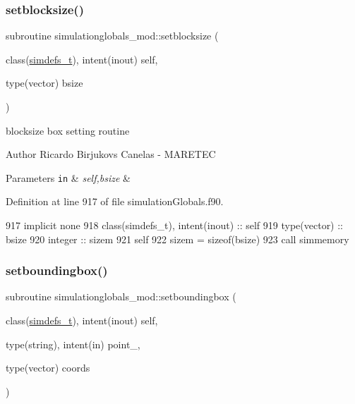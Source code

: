 \subsubsection{\texorpdfstring{setblocksize()}{setblocksize()}}
{\footnotesize\ttfamily subroutine simulationglobals\+\_\+mod\+::setblocksize (\begin{DoxyParamCaption}\item[{class(\mbox{\hyperlink{structsimulationglobals__mod_1_1simdefs__t}{simdefs\+\_\+t}}), intent(inout)}]{self,  }\item[{type(vector)}]{bsize }\end{DoxyParamCaption})\hspace{0.3cm}{\ttfamily [private]}}



blocksize box setting routine 

\begin{DoxyAuthor}{Author}
Ricardo Birjukovs Canelas -\/ M\+A\+R\+E\+T\+EC 
\end{DoxyAuthor}

\begin{DoxyParams}[1]{Parameters}
\mbox{\tt in}  & {\em self,bsize} & \\
\hline
\end{DoxyParams}


Definition at line 917 of file simulation\+Globals.\+f90.


\begin{DoxyCode}
917     \textcolor{keywordtype}{implicit none}
918     \textcolor{keywordtype}{class}(simdefs\_t), \textcolor{keywordtype}{intent(inout)} :: self
919     \textcolor{keywordtype}{type}(vector) :: bsize
920     \textcolor{keywordtype}{integer} :: sizem
921     self%
922     sizem = sizeof(bsize)
923     \textcolor{keyword}{call }simmemory%
\end{DoxyCode}
\mbox{\label{namespacesimulationglobals__mod_abf5afcc12763caab3a5fc394255ced44}} 
\subsubsection{\texorpdfstring{setboundingbox()}{setboundingbox()}}
{\footnotesize\ttfamily subroutine simulationglobals\+\_\+mod\+::setboundingbox (\begin{DoxyParamCaption}\item[{class(\mbox{\hyperlink{structsimulationglobals__mod_1_1simdefs__t}{simdefs\+\_\+t}}), intent(inout)}]{self,  }\item[{type(string), intent(in)}]{point\+\_\+,  }\item[{type(vector)}]{coords }\end{DoxyParamCaption})\hspace{0.3cm}{\ttfamily [private]}}



